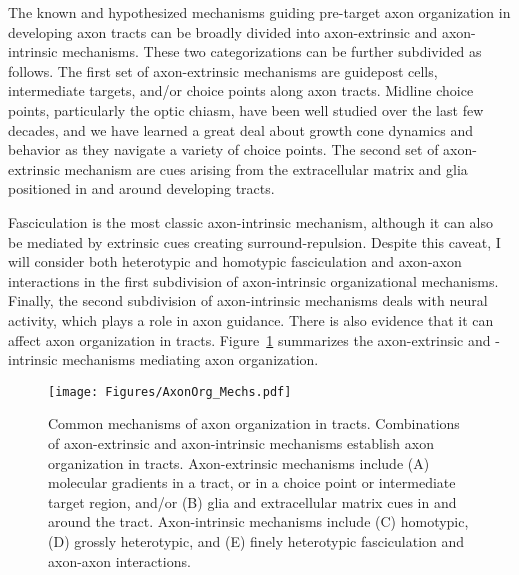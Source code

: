 \label{sec:MoleculesMechanisms}
The known and hypothesized mechanisms guiding pre-target axon organization in developing axon tracts can be broadly divided into axon-extrinsic and axon-intrinsic mechanisms.
These two categorizations can be further subdivided as follows.
The first set of axon-extrinsic mechanisms are guidepost cells, intermediate targets, and/or choice points along axon tracts.
Midline choice points, particularly the optic chiasm, have been well studied over the last few decades, and we have learned a great deal about growth cone dynamics and behavior as they navigate a variety of choice points.
The second set of axon-extrinsic mechanism are cues arising from the extracellular matrix and glia positioned in and around developing tracts.

Fasciculation is the most classic axon-intrinsic mechanism, although it can also be mediated by extrinsic cues creating surround-repulsion.
Despite this caveat, I will consider both heterotypic and homotypic fasciculation and axon-axon interactions in the first subdivision of axon-intrinsic organizational mechanisms.
Finally, the second subdivision of axon-intrinsic mechanisms deals with neural activity, which plays a role in axon guidance.
There is also evidence that it can affect axon organization in tracts.
Figure~\ref{AxonOrgMechs} summarizes the axon-extrinsic and -intrinsic mechanisms mediating axon organization.
\begin{figure}[hbtp]
    \begin{center}
    \texttt{[image: Figures/AxonOrg\_Mechs.pdf]}
    \caption[Common mechanisms of axon organization in tracts.]
    {Common mechanisms of axon organization in tracts.
    Combinations of axon-extrinsic and axon-intrinsic mechanisms establish axon organization in tracts.
    Axon-extrinsic mechanisms include (A) molecular gradients in a tract, or in a choice point or intermediate target region, and/or (B) glia and extracellular matrix cues in and around the tract.
    Axon-intrinsic mechanisms include (C) homotypic, (D) grossly heterotypic, and (E) finely heterotypic fasciculation and axon-axon interactions.}
    \label{AxonOrgMechs}
    \end{center}
\end{figure}
